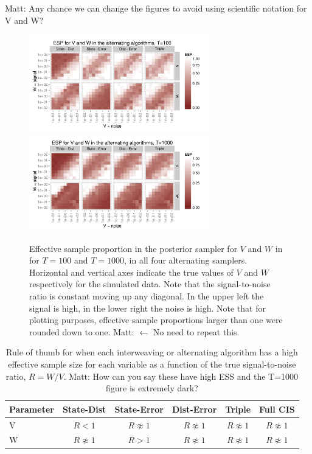 \documentclass{article}
\newcommand{\matt}[1]{{\color{red} Matt: #1}}
\begin{document}
\matt{Any chance we can change the figures to avoid using scientific notation for V and W?}

\begin{figure}[!ht]
\centering
\includegraphics[width=0.7\textwidth]{altESplot1}
\includegraphics[width=0.7\textwidth]{altESplot2}
\caption{Effective sample proportion in the posterior sampler for $V$ and $W$ in for $T=100$ and $T=1000$, in all four alternating samplers. Horizontal and vertical axes indicate the true values of $V$ and $W$ respectively for the simulated data. Note that the signal-to-noise ratio is constant moving up any diagonal. In the upper left the signal is high, in the lower right the noise is high. Note that for plotting purposes, effective sample proportions larger than one were rounded down to one. \matt{$\leftarrow$ No need to repeat this.}}
\label{altESplot}
\end{figure}

\begin{table}
  \centering
  \begin{tabular}{|l|ccccc|}\hline
    Parameter & State-Dist        & State-Error       & Dist-Error        & Triple            & Full CIS \\\hline
    V         & $R < 1$           & $R \not\approx 1$ & $R \not\approx 1$ & $R \not\approx 1$ & $R \not\approx 1$ \\
    W         & $R \not\approx 1$ & $R > 1$           & $R \not\approx 1$ & $R \not\approx 1$ & $R \not\approx 1$\\\hline
  \end{tabular}
  \caption{Rule of thumb for when each interweaving or alternating algorithm has a high effective sample size for each variable as a function of the true signal-to-noise ratio, $R=W/V$. \matt{How can you say these have high ESS and the T=1000 figure is extremely dark?}}
  \label{tab:stnmix2}
\end{table}
\end{document}
